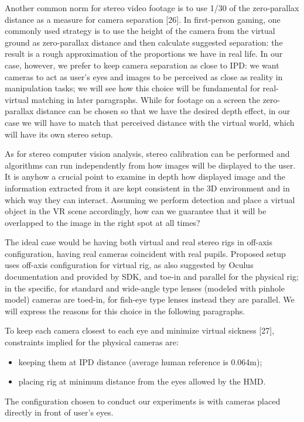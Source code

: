 Another common norm for stereo video footage is to use 1/30 of the zero-parallax distance as a measure for camera separation [26]. In first-person gaming, one commonly used strategy is to use the height of the camera from the virtual ground as zero-parallax distance and then calculate suggested separation: the result is a rough approximation of the proportions we have in real life. In our case, however, we prefer to keep camera separation as close to IPD: we want cameras to act as user's eyes and images to be perceived as close as reality in manipulation tasks; we will see how this choice will be fundamental for real-virtual matching in later paragraphs. While for footage on a screen the zero-parallax distance can be chosen so that we have the desired depth effect, in our case we will have to match that perceived distance with the virtual world, which will have its own stereo setup.

As for stereo computer vision analysis, stereo calibration can be performed and algorithms can run independently from how images will be displayed to the user. It is anyhow a crucial point to examine in depth how displayed image and the information extracted from it are kept consistent in the 3D environment and in which way they can interact. Assuming we perform detection and place a virtual object in the VR scene accordingly, how can we guarantee that it will be overlapped to the image in the right spot at all times?

The ideal case would be having both virtual and real stereo rigs in off-axis configuration, having real cameras coincident with real pupils. Proposed setup uses off-axis configuration for virtual rig, as also suggested by Oculus documentation and provided by SDK, and toe-in and parallel for the physical rig; in the specific, for standard and wide-angle type lenses (modeled with pinhole model) cameras are toed-in, for fish-eye type lenses instead they are parallel. We will express the reasons for this choice in the following paragraphs.

To keep each camera closest to each eye and minimize virtual sickness [27], constraints implied for the physical cameras are:
\begin{itemize}
\item keeping them at IPD distance (average human reference is 0.064m);
\item placing rig at minimum distance from the eyes allowed by the HMD.
\end{itemize}
The configuration chosen to conduct our experiments is with cameras placed directly in front of user's eyes.

